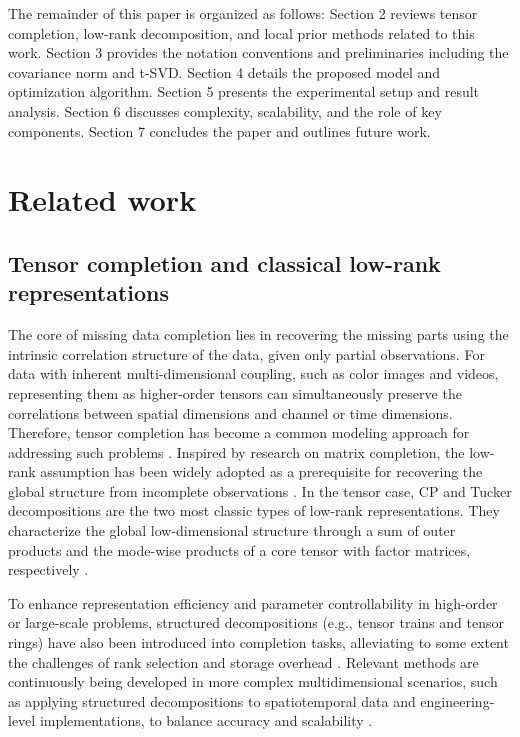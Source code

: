 \documentclass[a4paper,12pt]{article}
\numberwithin{equation}{section}
\numberwithin{algorithm}{section}
\theoremstyle{remark}
\theoremstyle{definition}
\begin{document}
The remainder of this paper is organized as follows: Section 2 reviews tensor completion, low-rank decomposition, and local prior methods related to this work. Section 3 provides the notation conventions and preliminaries including the covariance norm and  t-SVD. Section 4 details the proposed model and optimization algorithm. Section 5 presents the experimental setup and result analysis. Section 6 discusses complexity, scalability, and the role of key components. Section 7 concludes the paper and outlines future work.






\section{Related work}

\subsection{Tensor completion and classical low-rank representations}
The core of missing data completion lies in recovering the missing parts using the intrinsic correlation structure of the data, given only partial observations. For data with inherent multi-dimensional coupling, such as color images and videos, representing them as higher-order tensors can simultaneously preserve the correlations between spatial dimensions and channel or time dimensions. Therefore, tensor completion has become a common modeling approach for addressing such problems \cite{liu2013tensor, panagakis2021tensorcvdl}. Inspired by research on matrix completion, the low-rank assumption has been widely adopted as a prerequisite for recovering the global structure from incomplete observations \cite{candes2009matrix}. In the tensor case, CP and Tucker decompositions are the two most classic types of low-rank representations. They characterize the global low-dimensional structure through a sum of outer products and the mode-wise products of a core tensor with factor matrices, respectively \cite{kolda2009tensor}.

To enhance representation efficiency and parameter controllability in high-order or large-scale problems, structured decompositions (e.g., tensor trains and tensor rings) have also been introduced into completion tasks, alleviating to some extent the challenges of rank selection and storage overhead \cite{oseledets2011tt,bengua2017tt}. Relevant methods are continuously being developed in more complex multidimensional scenarios, such as applying structured decompositions to spatiotemporal data and engineering-level implementations, to balance accuracy and scalability \cite{yuan2019tensor,chen2025geotensor}.
\end{document}
